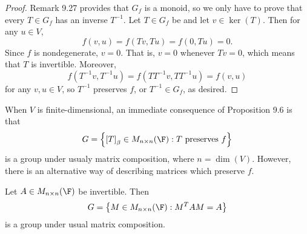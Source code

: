 \documentclass[linearalgebra]{subfiles}
\begin{document}
    \begin{proof}
        Remark 9.27 provides that $G_f$ is a monoid, so we only have to prove that every $T\in G_f$ has an inverse $T^{-1}$. Let $T\in G_f$ be and let $v\in\ker(T)$. Then for any $u\in V$,
        \begin{equation*}
            f\left( v,u \right) = f\left( Tv, Tu \right) = f\left( 0, Tu \right) = 0.
        \end{equation*}
        Since $f$ is nondegenerate, $v=0$. That is, $v=0$ whenever $Tv = 0$, which means that $T$ is invertible. Moreover, 
        \begin{equation*}
            f\left( T^{-1}v, T^{-1}u \right) = f\left( TT^{-1}v, TT^{-1}u \right) = f\left( v,u \right) 
        \end{equation*}
        for any $v,u\in V$, so $T^{-1}$ preserves $f$, or $T^{-1}\in G_f$, as desired.
    \end{proof}

    \begin{remark}
        When $V$ is finite-dimensional, an immediate consequence of Proposition 9.6 is that
        \begin{equation*}
            G = \left\lbrace \left[ T \right] _\beta\in M_{n\times n}(\F): T\text{ preserves }f \right\rbrace 
        \end{equation*}
        is a group under usualy matrix composition, where $n=\dim(V)$. However, there is an alternative way of describing matrices which preserve $f$.
    \end{remark}

    \begin{cor}{}
        Let $A\in M_{n\times n}(\F)$ be invertible. Then
        \begin{equation*}
            G = \left\lbrace M\in M_{n\times n}(\F): M^TAM = A \right\rbrace 
        \end{equation*}
        is a group under usual matrix composition.
    \end{cor}	
\end{document}
